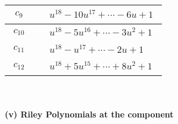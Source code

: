 \documentclass[1p]{elsarticle_modified}
\theoremstyle{definition}
\begin{document}
\begin{tabular}{m{50pt}|m{274pt}}
\hline $$\begin{aligned}c_{9}\end{aligned}$$&$\begin{aligned}
&u^{18}-10 u^{17}+\cdots-6 u+1
\end{aligned}$\\
\hline $$\begin{aligned}c_{10}\end{aligned}$$&$\begin{aligned}
&u^{18}-5 u^{16}+\cdots-3 u^2+1
\end{aligned}$\\
\hline $$\begin{aligned}c_{11}\end{aligned}$$&$\begin{aligned}
&u^{18}- u^{17}+\cdots-2 u+1
\end{aligned}$\\
\hline $$\begin{aligned}c_{12}\end{aligned}$$&$\begin{aligned}
&u^{18}+5 u^{15}+\cdots+8 u^2+1
\end{aligned}$\\
\hline
\end{tabular}\\~\\
\newpage\renewcommand{\arraystretch}{1}
\flushleft \textbf{(v) Riley Polynomials at the component}\newline \\
\end{document}
